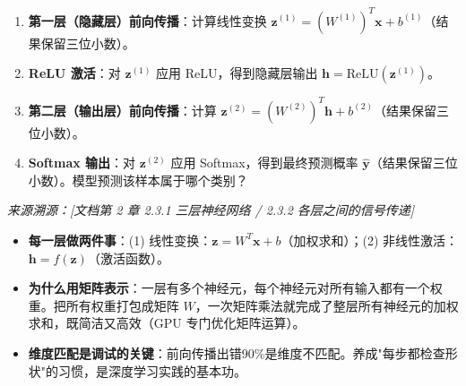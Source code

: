 \documentclass[a4paper,11pt]{ctexart}
\begin{document}
\begin{problembox}
\begin{enumerate}[(1)]
        \item \textbf{第一层（隐藏层）前向传播}：计算线性变换 $\mathbf{z}^{(1)} = (W^{(1)})^T \mathbf{x} + b^{(1)}$（结果保留三位小数）。

        \item \textbf{ReLU 激活}：对 $\mathbf{z}^{(1)}$ 应用 ReLU，得到隐藏层输出 $\mathbf{h} = \text{ReLU}(\mathbf{z}^{(1)})$。

        \item \textbf{第二层（输出层）前向传播}：计算 $\mathbf{z}^{(2)} = (W^{(2)})^T \mathbf{h} + b^{(2)}$（结果保留三位小数）。

        \item \textbf{Softmax 输出}：对 $\mathbf{z}^{(2)}$ 应用 Softmax，得到最终预测概率 $\hat{\mathbf{y}}$（结果保留三位小数）。模型预测该样本属于哪个类别？
    \end{enumerate}

    \vspace{0.2cm}
    {\color{gray}\small\textit{来源溯源：[文档第 2 章 2.3.1 三层神经网络 / 2.3.2 各层之间的信号传递]}}
\end{problembox}

\begin{beginnerbox}
    \begin{itemize}
        \item \textbf{每一层做两件事}：(1) 线性变换：$\mathbf{z} = W^T\mathbf{x} + b$（加权求和）；(2) 非线性激活：$\mathbf{h} = f(\mathbf{z})$（激活函数）。
        \item \textbf{为什么用矩阵表示}：一层有多个神经元，每个神经元对所有输入都有一个权重。把所有权重打包成矩阵 $W$，一次矩阵乘法就完成了整层所有神经元的加权求和，既简洁又高效（GPU 专门优化矩阵运算）。
        \item \textbf{维度匹配是调试的关键}：前向传播出错90\%是维度不匹配。养成"每步都检查形状"的习惯，是深度学习实践的基本功。
    \end{itemize}
\end{beginnerbox}
\end{document}
